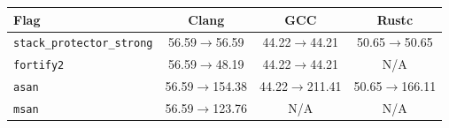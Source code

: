 \begin{tabular*}{\columnwidth}{@{\extracolsep\fill}lccc@{\extracolsep\fill}}
\toprule
\textbf{Flag} & \textbf{Clang} & \textbf{GCC} & \textbf{Rustc} \\
\midrule
\texttt{stack\_protector\_strong} & 56.59$\to$56.59 & 44.22$\to$44.21 & 50.65$\to$50.65 \\
\texttt{fortify2} & 56.59$\to$48.19 & 44.22$\to$44.21 & N/A \\
\texttt{asan} & 56.59$\to$154.38 & 44.22$\to$211.41 & 50.65$\to$166.11 \\
\texttt{msan} & 56.59$\to$123.76 & N/A & N/A \\
\bottomrule
\end{tabular*}
